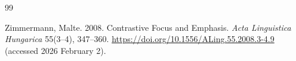 \documentclass[ruler]{CUP-JNL-LIN}%
\begin{document}
\begin{Backmatter}
\begin{thebibliography}{99}

{Zimmermann, Malte}. 2008. Contrastive Focus and Emphasis. \textit{Acta Linguistica Hungarica} 55(3--4), 347--360. \url{https://doi.org/10.1556/ALing.55.2008.3-4.9} (accessed 2026 February 2).

\end{thebibliography}



\end{Backmatter}
\end{document}
